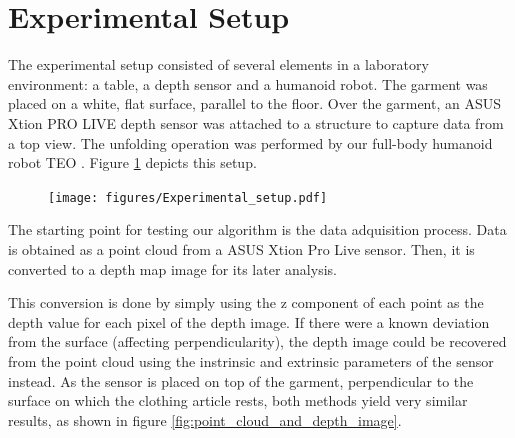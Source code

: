 \section{Experimental Setup}
\label{experiments:expermimental_setup}

The experimental setup consisted of several elements in a laboratory environment: a table, a depth sensor and a humanoid robot. The garment was placed on a white, flat surface, parallel to the floor. Over the garment, an ASUS Xtion PRO LIVE depth sensor was attached to a structure to capture data from a top view. The unfolding operation was performed by our full-body humanoid robot TEO \cite{martinez2012teo}. Figure \ref{fig:experimental_setup} depicts this setup.

\begin{figure}[thpb]
    \centering
    \texttt{[image: figures/Experimental\_setup.pdf]}
    \caption{}
    \label{fig:experimental_setup}
\end{figure}

The starting point for testing our algorithm is the data adquisition process. Data is obtained as a point cloud from a ASUS Xtion Pro Live sensor. Then, it is converted to a depth map image for its later analysis. 

This conversion is done by simply using the z component of each point as the depth value for each pixel of the depth image. If there were a known deviation from the surface (affecting perpendicularity), the depth image could be recovered from the point cloud using the instrinsic and extrinsic parameters of the sensor instead. As the sensor is placed on top of the garment, perpendicular to the surface on which the clothing article rests, both methods yield very similar results, as shown in figure \ref{fig:point_cloud_and_depth_image}.



